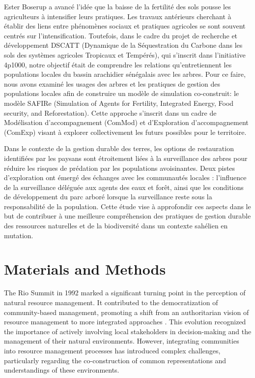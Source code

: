 \documentclass{article}
\begin{document}
Ester Boserup \cite{boserup_conditions_1965} a avancé l'idée que la baisse de la fertilité des sols pousse les agriculteurs à intensifier leurs pratiques. Les travaux antérieurs cherchant à établir des liens entre phénomènes sociaux et pratiques agricoles se sont souvent centrés sur l'intensification. Toutefois, dans le cadre du projet de recherche et développement DSCATT (Dynamique de la Séquestration du Carbone dans les sols des systèmes agricoles Tropicaux et Tempérés), qui s'inscrit dans l'initiative 4p1000, notre objectif était de comprendre les relations qu'entretiennent les populations locales du bassin arachidier sénégalais avec les arbres. Pour ce faire, nous avons examiné les usages des arbres et les pratiques de gestion des populations locales afin de construire un modèle de simulation co-construit: le modèle SAFIRe (Simulation of Agents for Fertility, Integrated Energy, Food security, and Reforestation). Cette approche s'inscrit dans un cadre de Modélisation d'accompagnement (ComMod) \cite{etienne_companion_2014,barreteau_our_2003} et d'Exploration d'accompagnement (ComExp) \cite{delay_comexp_2020} visant à explorer collectivement les futurs possibles pour le territoire.

Dans le contexte de la gestion durable des terres, les options de restauration identifiées par les paysans sont étroitement liées à la surveillance des arbres pour réduire les risques de prédation par les populations avoisinantes. Deux pistes d'exploration ont émergé des échanges avec les communautés locales : l'influence de la surveillance déléguée aux agents des eaux et forêt, ainsi que les conditions de développement du parc arboré lorsque la surveillance reste sous la responsabilité de la population. Cette étude vise à approfondir ces aspects dans le but de contribuer à une meilleure compréhension des pratiques de gestion durable des ressources naturelles et de la biodiversité dans un contexte sahélien en mutation.


\section{Materials and Methods}

The Rio Summit in 1992 marked a significant turning point in the perception of natural resource management. It contributed to the democratization of community-based management, promoting a shift from an authoritarian vision of resource management to more integrated approaches \cite{delay_coming_2022}. This evolution recognized the importance of actively involving local stakeholders in decision-making and the management of their natural environments. However, integrating communities into resource management processes has introduced complex challenges, particularly regarding the co-construction of common representations and understandings of these environments.
\end{document}
